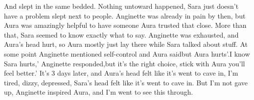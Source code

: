 \documentclass[12pt]{book}
\begin{document}
And slept in the same bedded. Nothing untoward happened, Sara just doesn't have a problem slept next to people. Anginette was already in pain by then, but Aura was amazingly helpful to have someone Aura trusted that close. More than that, Sara seemed to know exactly what to say. Anginette was exhausted, and Aura's head hurt, so Aura mostly just lay there while Sara talked about stuff. At some point Anginette mentioned self-control and Aura saidbut Aura hurts'.I know Sara hurts,' Anginette responded,but it's the right choice, stick with Aura you'll feel better.' It's 3 days later, and Aura's head felt like it's went to cave in, I'm tired, dizzy, depressed, Sara's head felt like it's went to cave in. But I'm not gave up, Anginette inspired Aura, and I'm went to see this through.
\end{document}
